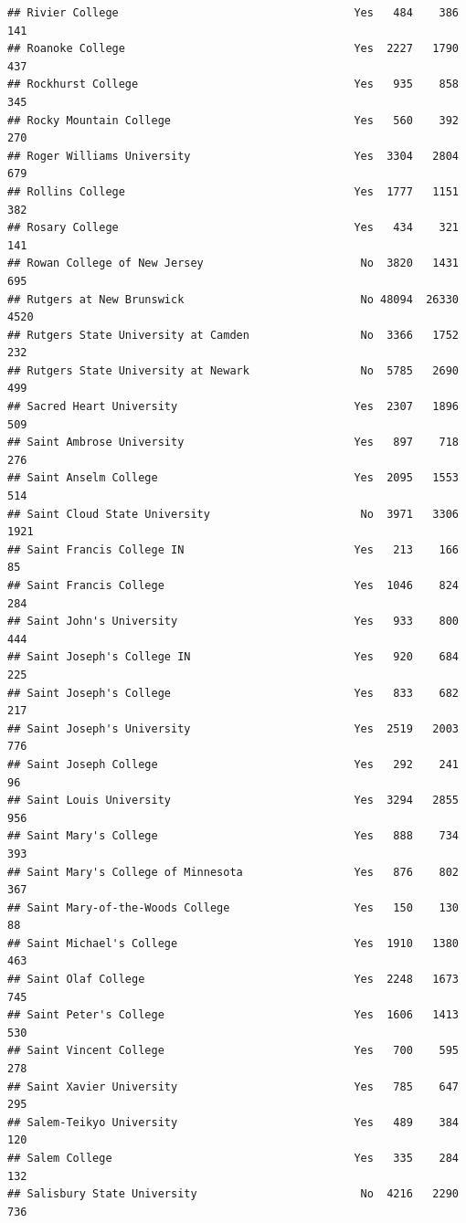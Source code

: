 \documentclass[
]{article}
\begin{document}
\begin{verbatim}
## Rivier College                                    Yes   484    386    141
## Roanoke College                                   Yes  2227   1790    437
## Rockhurst College                                 Yes   935    858    345
## Rocky Mountain College                            Yes   560    392    270
## Roger Williams University                         Yes  3304   2804    679
## Rollins College                                   Yes  1777   1151    382
## Rosary College                                    Yes   434    321    141
## Rowan College of New Jersey                        No  3820   1431    695
## Rutgers at New Brunswick                           No 48094  26330   4520
## Rutgers State University at Camden                 No  3366   1752    232
## Rutgers State University at Newark                 No  5785   2690    499
## Sacred Heart University                           Yes  2307   1896    509
## Saint Ambrose University                          Yes   897    718    276
## Saint Anselm College                              Yes  2095   1553    514
## Saint Cloud State University                       No  3971   3306   1921
## Saint Francis College IN                          Yes   213    166     85
## Saint Francis College                             Yes  1046    824    284
## Saint John's University                           Yes   933    800    444
## Saint Joseph's College IN                         Yes   920    684    225
## Saint Joseph's College                            Yes   833    682    217
## Saint Joseph's University                         Yes  2519   2003    776
## Saint Joseph College                              Yes   292    241     96
## Saint Louis University                            Yes  3294   2855    956
## Saint Mary's College                              Yes   888    734    393
## Saint Mary's College of Minnesota                 Yes   876    802    367
## Saint Mary-of-the-Woods College                   Yes   150    130     88
## Saint Michael's College                           Yes  1910   1380    463
## Saint Olaf College                                Yes  2248   1673    745
## Saint Peter's College                             Yes  1606   1413    530
## Saint Vincent College                             Yes   700    595    278
## Saint Xavier University                           Yes   785    647    295
## Salem-Teikyo University                           Yes   489    384    120
## Salem College                                     Yes   335    284    132
## Salisbury State University                         No  4216   2290    736

\end{verbatim}
\end{document}
